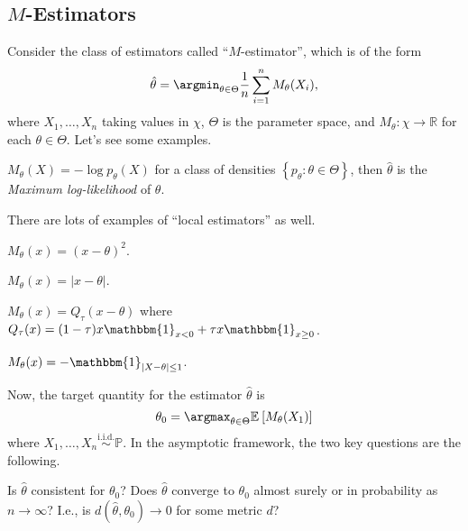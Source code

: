 \subsection{\(M\)-Estimators}\label{subsec:M-estimators}
Consider the class of estimators called ``\(M\)-estimator'', which is of the form
\[
	\hat{\theta} = \argmin_{\theta \in \Theta } \frac{1}{n} \sum_{i=1}^{n} M_\theta (X_i),
\]
where \(X_1, \dots , X_n \) taking values in \(\chi \), \(\Theta \) is the parameter space, and \(M_\theta \colon \chi \to \mathbb{R} \) for each \(\theta \in \Theta \). Let's see some examples.

\begin{eg}
	\(M_\theta (X) = - \log p_\theta (X)\) for a class of densities \(\left\{ p_\theta \colon \theta \in \Theta  \right\} \), then \(\hat{\theta} \) is the \emph{Maximum log-likelihood} of \(\theta \).
\end{eg}

There are lots of examples of ``local estimators'' as well.

\begin{eg}[Mean]
	\(M_\theta (x) = (x-\theta )^2\).
\end{eg}

\begin{eg}[Median]
	\(M_\theta (x) = \vert x - \theta  \vert\).
\end{eg}

\begin{eg}
	\(M_\theta (x) = Q_{\tau } (x - \theta )\) where \(Q_\tau (x) = (1 - \tau ) x \mathbbm{1}_{x < 0} + \tau x \mathbbm{1}_{x\geq 0} \).
\end{eg}

\begin{eg}[Mode]
	\(M_\theta (x) = - \mathbbm{1}_{\vert X - \theta  \vert \leq 1}\).
\end{eg}

Now, the target quantity for the estimator \(\hat{\theta} \) is
\[
	\theta _0 = \argmax_{\theta \in \Theta } \mathbb{E}_{}\left[M_\theta (X_1) \right]
\]
where \(X_1, \dots , X_n \overset{\text{i.i.d.} }{\sim }\mathbb{P} \). In the asymptotic framework, the two key questions are the following.

\begin{problem*}
	Is \(\hat{\theta} \) consistent for \(\theta _0\)? Does \(\hat{\theta} \) converge to \(\theta _0\) almost surely or in probability as \(n\to \infty \)? I.e., is \(d(\hat{\theta} , \theta _0)\to 0\) for some metric \(d\)?
\end{problem*}

